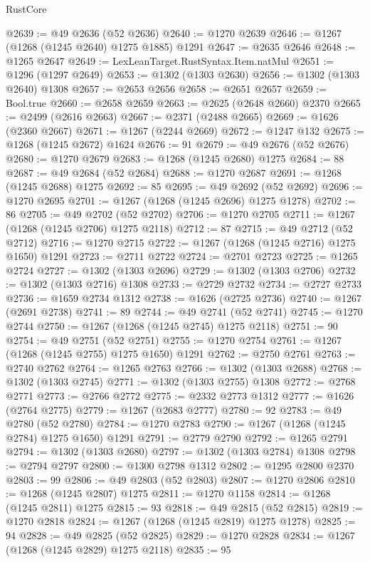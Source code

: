 \begin{lexlean}{RustCore}
\begin{coremodule}
@2639 := @49 @2636 (@52 @2636)
@2640 := @1270 @2639
@2646 := @1267 (@1268 (@1245 @2640) @1275 @1885) @1291
@2647 := @2635 @2646
@2648 := @1265 @2647
@2649 := LexLeanTarget.RustSyntax.Item.natMul
@2651 := @1296 (@1297 @2649)
@2653 := @1302 (@1303 @2630)
@2656 := @1302 (@1303 @2640) @1308
@2657 := @2653 @2656
@2658 := @2651 @2657
@2659 := Bool.true
@2660 := @2658 @2659
@2663 := @2625 (@2648 @2660) @2370
@2665 := @2499 (@2616 @2663)
@2667 := @2371 (@2488 @2665)
@2669 := @1626 (@2360 @2667)
@2671 := @1267 (@2244 @2669)
@2672 := @1247 @132
@2675 := @1268 (@1245 @2672) @1624
@2676 := 91
@2679 := @49 @2676 (@52 @2676)
@2680 := @1270 @2679
@2683 := @1268 (@1245 @2680) @1275
@2684 := 88
@2687 := @49 @2684 (@52 @2684)
@2688 := @1270 @2687
@2691 := @1268 (@1245 @2688) @1275
@2692 := 85
@2695 := @49 @2692 (@52 @2692)
@2696 := @1270 @2695
@2701 := @1267 (@1268 (@1245 @2696) @1275 @1278)
@2702 := 86
@2705 := @49 @2702 (@52 @2702)
@2706 := @1270 @2705
@2711 := @1267 (@1268 (@1245 @2706) @1275 @2118)
@2712 := 87
@2715 := @49 @2712 (@52 @2712)
@2716 := @1270 @2715
@2722 := @1267 (@1268 (@1245 @2716) @1275 @1650) @1291
@2723 := @2711 @2722
@2724 := @2701 @2723
@2725 := @1265 @2724
@2727 := @1302 (@1303 @2696)
@2729 := @1302 (@1303 @2706)
@2732 := @1302 (@1303 @2716) @1308
@2733 := @2729 @2732
@2734 := @2727 @2733
@2736 := @1659 @2734 @1312
@2738 := @1626 (@2725 @2736)
@2740 := @1267 (@2691 @2738)
@2741 := 89
@2744 := @49 @2741 (@52 @2741)
@2745 := @1270 @2744
@2750 := @1267 (@1268 (@1245 @2745) @1275 @2118)
@2751 := 90
@2754 := @49 @2751 (@52 @2751)
@2755 := @1270 @2754
@2761 := @1267 (@1268 (@1245 @2755) @1275 @1650) @1291
@2762 := @2750 @2761
@2763 := @2740 @2762
@2764 := @1265 @2763
@2766 := @1302 (@1303 @2688)
@2768 := @1302 (@1303 @2745)
@2771 := @1302 (@1303 @2755) @1308
@2772 := @2768 @2771
@2773 := @2766 @2772
@2775 := @2332 @2773 @1312
@2777 := @1626 (@2764 @2775)
@2779 := @1267 (@2683 @2777)
@2780 := 92
@2783 := @49 @2780 (@52 @2780)
@2784 := @1270 @2783
@2790 := @1267 (@1268 (@1245 @2784) @1275 @1650) @1291
@2791 := @2779 @2790
@2792 := @1265 @2791
@2794 := @1302 (@1303 @2680)
@2797 := @1302 (@1303 @2784) @1308
@2798 := @2794 @2797
@2800 := @1300 @2798 @1312
@2802 := @1295 @2800 @2370
@2803 := 99
@2806 := @49 @2803 (@52 @2803)
@2807 := @1270 @2806
@2810 := @1268 (@1245 @2807) @1275
@2811 := @1270 @1158
@2814 := @1268 (@1245 @2811) @1275
@2815 := 93
@2818 := @49 @2815 (@52 @2815)
@2819 := @1270 @2818
@2824 := @1267 (@1268 (@1245 @2819) @1275 @1278)
@2825 := 94
@2828 := @49 @2825 (@52 @2825)
@2829 := @1270 @2828
@2834 := @1267 (@1268 (@1245 @2829) @1275 @2118)
@2835 := 95

\end{coremodule}
\end{lexlean}
